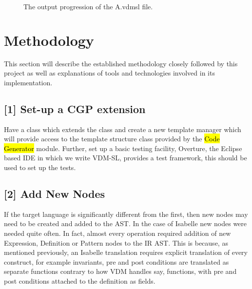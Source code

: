 \begin{figure}
        \caption{\label{fig:OES} The output progression of the A.vdmsl file.}
\end{figure}

\section{Methodology}
This section will describe the established methodology closely followed by this project as well as explanations of tools and technologies involved in its implementation.

	\subsection{	[1] Set-up a CGP extension} \label{s1}
	Have a class which extends the  class and create a new template manager which will provide access to the template structure class provided by the \ttfamily\hl{Code Generator} \rmfamily module. Further, set up a basic testing facility, Overture, the Eclipse based IDE in which we write VDM-SL, provides a test framework, this should be used to set up the tests. 
	\subsection{	[2] Add New Nodes}
	If the target language is significantly different from the first, then new nodes may need to be created and added to the AST. In the case of Isabelle new nodes were needed quite often. In fact, almost every operation required addition of new Expression, Definition or Pattern nodes to the IR AST. This is because, as mentioned previously, an Isabelle translation requires explicit translation of every construct, for example invariants, pre and post conditions are translated as separate functions contrary to how VDM handles say, functions, with pre and post conditions attached to the definition as fields.
